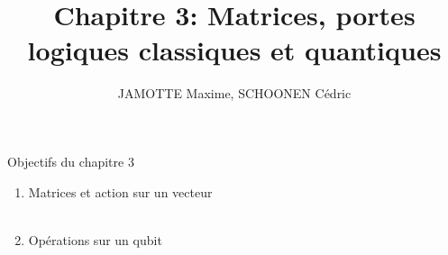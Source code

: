 \documentclass[aspectratio=169,12pt]{beamer}
\begin{document}
\title[Chapter 3]{Chapitre 3: Matrices, portes logiques classiques et quantiques}
\author{JAMOTTE Maxime, SCHOONEN Cédric}
\date{}

\begin{frame}
  \titlepage
\end{frame}

\begin{frame}{Objectifs du chapitre 3}
  \begin{enumerate}
    \item Matrices et action sur un vecteur\\~\\
    \item Opérations sur un qubit\\~\\
  \end{enumerate}
\end{frame}
\end{document}
